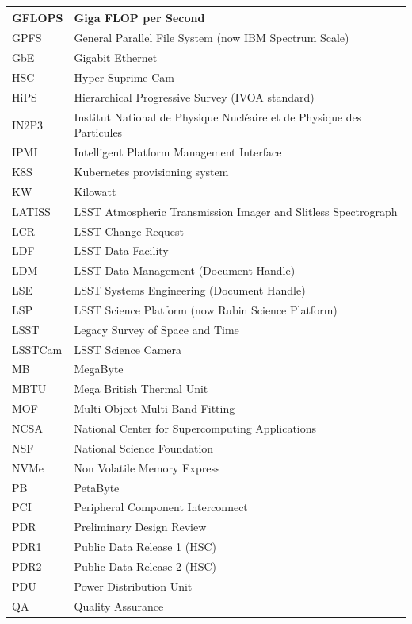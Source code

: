 \begin{longtable}{p{}p{}}
GFLOPS & Giga FLOP per Second \\\hline
GPFS & General Parallel File System (now IBM Spectrum Scale) \\\hline
GbE & Gigabit Ethernet \\\hline
HSC & Hyper Suprime-Cam \\\hline
HiPS & Hierarchical Progressive Survey (IVOA standard) \\\hline
IN2P3 & Institut National de Physique Nucléaire et de Physique des Particules \\\hline
IPMI & Intelligent Platform Management Interface \\\hline
K8S & Kubernetes provisioning system \\\hline
KW & Kilowatt \\\hline
LATISS & LSST Atmospheric Transmission Imager and Slitless Spectrograph \\\hline
LCR & LSST Change Request \\\hline
LDF & LSST Data Facility \\\hline
LDM & LSST Data Management (Document Handle) \\\hline
LSE & LSST Systems Engineering (Document Handle) \\\hline
LSP & LSST Science Platform (now Rubin Science Platform) \\\hline
LSST & Legacy Survey of Space and Time \\\hline
LSSTCam & LSST Science Camera \\\hline
MB & MegaByte \\\hline
MBTU & Mega British Thermal Unit \\\hline
MOF & Multi-Object Multi-Band Fitting \\\hline
NCSA & National Center for Supercomputing Applications \\\hline
NSF & National Science Foundation \\\hline
NVMe & Non Volatile Memory Express \\\hline
PB & PetaByte \\\hline
PCI & Peripheral Component Interconnect \\\hline
PDR & Preliminary Design Review \\\hline
PDR1 & Public Data Release 1 (HSC) \\\hline
PDR2 & Public Data Release 2 (HSC) \\\hline
PDU & Power Distribution Unit \\\hline
QA & Quality Assurance \\\hline

\end{longtable}

